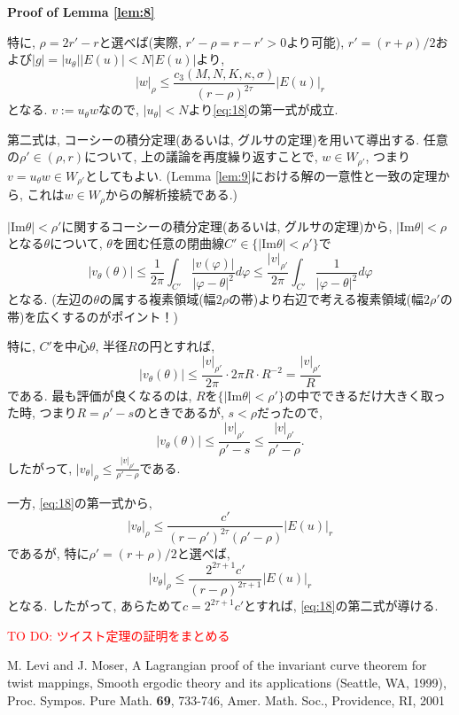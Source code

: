 \documentclass[a4paper]{ujarticle}
\makeatletter
\newcommand{\red}[1]{\textcolor{red}{#1}} %
\numberwithin{equation}{section}
\theoremstyle{definition}
\renewenvironment{proof}[1][Proof]{\par
  \pushQED{\qed}%
  \normalfont \topsep6\p@\@plus6\p@\relax
  \trivlist
  \item\relax
  {\bfseries
  #1\@addpunct{.}}\hspace\labelsep\ignorespaces
}{%
  \popQED\endtrivlist\@endpefalse
}
\makeatother
\begin{document}
\begin{proof}[Proof of Lemma \ref{lem:8}]
            特に, $\rho = 2r' - r$と選べば(実際, $r' - \rho = r - r' > 0$より可能), 
            $r' = (r + \rho)/2$および$|g| = |u_{\theta}| |E(u)| < N |E(u)|$より, 
            \begin{equation} \label{eq:28}
                |w|_{\rho} \leq \frac{c_3(M, N, K, \kappa, \sigma)}{(r - \rho)^{2\tau}}|E(u)|_{r}
            \end{equation}
            となる.
            $v := u_{\theta} w$なので, $|u_{\theta}| < N$より\eqref{eq:18}の第一式が成立.

            第二式は, コーシーの積分定理(あるいは, グルサの定理)を用いて導出する.
            任意の$\rho' \in (\rho, r)$について, 上の議論を再度繰り返すことで, $w \in W_{\rho'}$, 
            つまり$v = u_{\theta} w \in W_{\rho'}$としてもよい. 
            (Lemma \ref{lem:9}における解の一意性と一致の定理から, これは$w \in W_{\rho}$からの解析接続である.)

            $|\mathrm{Im} \theta | < \rho'$に関するコーシーの積分定理(あるいは, グルサの定理)から, 
            $|\mathrm{Im} \theta | < \rho$となる$\theta$について, 
            $\theta$を囲む任意の閉曲線$C' \in \{|\mathrm{Im} \theta | < \rho'\}$で
            \[
                |v_{\theta}(\theta)| \leq \frac{1}{2 \pi} \int_{C'} \frac{|v(\varphi)|}{|\varphi - \theta|^2} d \varphi \leq \frac{|v|_{\rho'}}{2 \pi} \int_{C'} \frac{1}{|\varphi - \theta|^2} d \varphi
            \]
            となる. (左辺の$\theta$の属する複素領域(幅$2 \rho$の帯)より右辺で考える複素領域(幅$2 \rho'$の帯)を広くするのがポイント！)

            特に, $C'$を中心$\theta$, 半径$R$の円とすれば, 
            \[
                |v_{\theta}(\theta)| \leq \frac{|v|_{\rho'}}{2 \pi} \cdot 2 \pi R \cdot R^{-2} = \frac{|v|_{\rho'}}{R}
            \]
            である. 最も評価が良くなるのは, $R$を$\{|\mathrm{Im} \theta | < \rho'\}$の中でできるだけ大きく取った時, 
            つまり$R = \rho' - s$のときであるが, $s < \rho$だったので, 
            \[
                |v_{\theta}(\theta)| \leq \frac{|v|_{\rho'}}{\rho' - s} \leq \frac{|v|_{\rho'}}{\rho' - \rho}.
            \]
            したがって, $|v_{\theta}|_{\rho} \leq \displaystyle \frac{|v|_{\rho'}}{\rho' - \rho}$である.

            一方, \eqref{eq:18}の第一式から,
            \[
                |v_{\theta}|_{\rho} \leq \frac{c'}{(r - \rho')^{2 \tau}(\rho' - \rho)} |E(u)|_{r}
            \]
            であるが, 特に$\rho' = (r + \rho)/2$と選べば,
            \[
                |v_{\theta}|_{\rho} \leq \frac{2^{2 \tau + 1} c'}{(r - \rho)^{2 \tau + 1}} |E(u)|_{r}
            \]
            となる. したがって, あらためて$c = 2^{2 \tau + 1} c'$とすれば, \eqref{eq:18}の第二式が導ける.
        \end{proof}
        
        \red{TO DO: ツイスト定理の証明をまとめる}
    \begin{thebibliography}{10}
    \nocite{*}
	  M. Levi and J. Moser, A Lagrangian proof of the invariant curve theorem for twist mappings, 
    Smooth ergodic theory and its applications (Seattle, WA, 1999), Proc. Sympos. Pure Math. \textbf{69}, 733-746, Amer. Math. Soc., Providence, RI, 2001 
\end{thebibliography}
\end{document}
